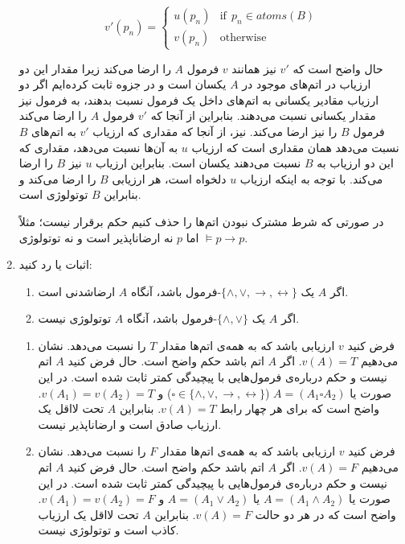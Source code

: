 \documentclass[12pt, 14paper]{article}
\begin{document}
\begin{enumerate}
\begin{ans}
  $$
  v'(p_n)=
  \begin{cases}
  u(p_n) & \text{if}~~p_n\in atoms(B) \\
  v(p_n) & \text{otherwise}
  \end{cases}
  $$

  حال واضح است که $v'$ نیز همانند $v$ فرمول $A$ را ارضا می‌کند زیرا مقدار این دو ارزیاب در اتم‌های موجود در $A$ یکسان است و در جزوه ثابت کرده‌ایم اگر دو ارزیاب مقادیر یکسانی به اتم‌های داخل یک فرمول نسبت بدهند، به فرمول نیز مقدار یکسانی نسبت می‌دهند. بنابراین از آنجا که $v'$ فرمول $A$ را ارضا می‌کند فرمول $B$ را نیز ارضا می‌کند. نیز، از آنجا که مقداری که ارزیاب $v'$ به اتم‌های $B$ نسبت می‌دهد همان مقداری است که ارزیاب $u$ به آن‌ها نسبت می‌دهد، مقداری که این دو ارزیاب به $B$ نسبت می‌دهند یکسان است. بنابراین ارزیاب $u$ نیز $B$ را ارضا می‌کند. با توجه به اینکه ارزیاب $u$ دلخواه است، هر ارزیابی $B$ را ارضا می‌کند و بنابراین $B$ توتولوژی است.

  در صورتی که شرط مشترک نبودن اتم‌ها را حذف کنیم حکم برقرار نیست؛ مثلاً
  $\models p\rightarrow p$
  اما $p$ نه ارضاناپذیر است و نه توتولوژی.
\end{ans}

\item
اثبات یا رد کنید:

\begin{enumerate}
\item
اگر $A$ یک $\{\wedge,\vee,\rightarrow,\leftrightarrow\}$-فرمول باشد، آنگاه $A$ ارضاشدنی است.
\item
اگر $A$ یک $\{\wedge,\vee\}$-فرمول باشد، آنگاه $A$ توتولوژی نیست.
\end{enumerate}
\quad
\begin{ans}
\begin{enumerate}
  \item
  فرض کنید $v$ ارزیابی باشد که به همه‌ی اتم‌ها مقدار $T$ را نسبت می‌دهد. نشان می‌دهیم $v(A)=T$. اگر $A$ اتم باشد حکم واضح است. حال فرض کنید $A$ اتم نیست و حکم درباره‌ی فرمول‌هایی با پیچیدگی کمتر ثابت شده است. در این صورت یا $A=(A_1\square A_2)$ ($\square\in\{\wedge,\vee,\rightarrow,\leftrightarrow\}$) و $v(A_1)=v(A_2)=T$. واضح است که برای هر چهار رابط $v(A)=T$. بنابراین $A$ تحت لااقل یک ارزیاب صادق است و ارضاناپذیر نیست.
  
  \item
  فرض کنید $v$ ارزیابی باشد که به همه‌ی اتم‌ها مقدار $F$ را نسبت می‌دهد. نشان می‌دهیم $v(A)=F$. اگر $A$ اتم باشد حکم واضح است. حال فرض کنید $A$ اتم نیست و حکم درباره‌ی فرمول‌هایی با پیچیدگی کمتر ثابت شده است. در این صورت یا $A=(A_1\wedge A_2)$ یا $A=(A_1\vee A_2)$ و $v(A_1)=v(A_2)=F$. واضح است که در هر دو حالت $v(A)=F$. بنابراین $A$ تحت لااقل یک ارزیاب کاذب است و توتولوژی نیست.
  

\end{enumerate}
\end{ans}
\end{enumerate}
\end{document}
